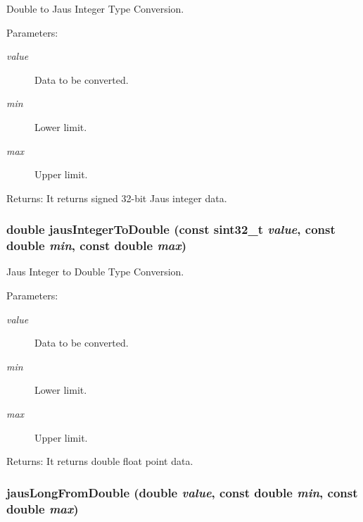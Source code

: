 Double to Jaus Integer Type Conversion. 

\begin{Desc}
\item[Parameters:]
\begin{description}
\item[{\em value}]Data to be converted. \item[{\em min}]Lower limit. \item[{\em max}]Upper limit.\end{description}
\end{Desc}
\begin{Desc}
\item[Returns:]It returns signed 32-bit Jaus integer data. \end{Desc}
\hypertarget{group__data__conv_g77978e778543c4b17b6e90f9c2d19f0d}{
\subsubsection[jausIntegerToDouble]{\setlength{\rightskip}{0pt plus 5cm}double jausIntegerToDouble (const {\bf sint32\_\-t} {\em value}, \/  const double {\em min}, \/  const double {\em max})}}
\label{group__data__conv_g77978e778543c4b17b6e90f9c2d19f0d}


Jaus Integer to Double Type Conversion. 

\begin{Desc}
\item[Parameters:]
\begin{description}
\item[{\em value}]Data to be converted. \item[{\em min}]Lower limit. \item[{\em max}]Upper limit.\end{description}
\end{Desc}
\begin{Desc}
\item[Returns:]It returns double float point data. \end{Desc}
\hypertarget{group__data__conv_g73f3ce33dc453cc3a03ab09735084140}{
\subsubsection[jausLongFromDouble]{ jausLongFromDouble (double {\em value}, \/  const double {\em min}, \/  const double {\em max})}}
\label{group__data__conv_g73f3ce33dc453cc3a03ab09735084140}


